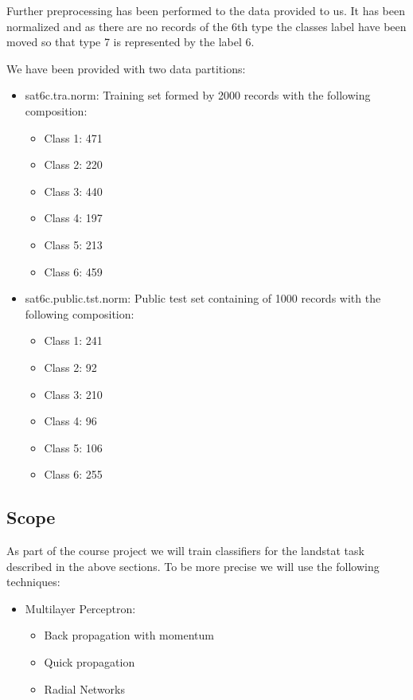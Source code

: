 \documentclass[a4paper,10pt,titlepage]{article}
\begin{document}
\par Further preprocessing has been performed to the data provided to us. It has been normalized and as there are no records of the 6th type the classes label have been moved so that type 7 is represented by the label 6. 

\par We have been provided with two data partitions:
\begin{itemize}
	\item sat6c.tra.norm: Training set formed by 2000 records with the following composition:
	\begin{itemize}
		\item Class 1: 471
		\item Class 2: 220
		\item Class 3: 440
		\item Class 4: 197
		\item Class 5: 213
		\item Class 6: 459
	\end{itemize}
	\item sat6c.public.tst.norm: Public test set containing of 1000 records with the following composition: 
	\begin{itemize}
		\item Class 1: 241
		\item Class 2: 92
		\item Class 3: 210
		\item Class 4: 96
		\item Class 5: 106
		\item Class 6: 255
	\end{itemize}
\end{itemize}


\subsection{Scope}

\par As part of the course project we will train classifiers for the landstat task described in the above sections. To be more precise we will use the following techniques:
\begin{itemize}
	\item Multilayer Perceptron:
		\begin{itemize}
			\item Back propagation with momentum
			\item Quick propagation
			\item Radial Networks
		\end{itemize}
\end{itemize}
\end{document}

